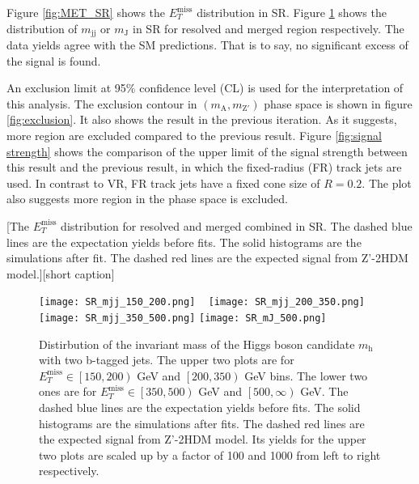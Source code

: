 \documentclass[class=NCU_thesis, crop=false]{standalone}
\begin{document}
	Figure \ref{fig:MET_SR} shows the $E_T^{\mathrm{miss}}$ distribution in SR. Figure \ref{fig:SR_mj} shows the distribution of $m_{\mathrm{jj}}$ or $m_{\mathrm{J}}$ in SR for resolved and merged region respectively. The data yields agree with the SM predictions. That is to say, no significant excess of the signal is found.
	
	An exclusion limit at 95\% confidence level (CL) is used for the interpretation of this analysis. The exclusion contour in $(m_{\mathrm{A}}, m_{\mathrm{Z'}})$ phase space is shown in figure \ref{fig:exclusion}. It also shows the result in the previous iteration. As it suggests, more region are excluded compared to the previous result. Figure \ref{fig:signal strength} shows the comparison of the upper limit of the signal strength between this result and the previous result, in which the fixed-radius (FR) track jets are used. In contrast to VR, FR track jets have a fixed cone size of $R = 0.2$. The plot also suggests more region in the phase space is excluded.
	
	[The $E_T^{\mathrm{miss}}$ distribution for resolved and merged combined in SR. The dashed blue lines are the expectation yields before fits. The solid histograms are the simulations after fit. The dashed red lines are the expected signal from Z'-2HDM model.][short caption]
	
	\begin{figure}[!hbt]
		\centering
		\subcaptionbox
		{\label{fig:subfig_SR_mjj_150_200}}
		{\texttt{[image: SR\_mjj\_150\_200.png]}}
		~
		\subcaptionbox
		{\label{fig:subfig_SR_mjj_200_350}}
		{\texttt{[image: SR\_mjj\_200\_350.png]}}
		\vspace{\baselineskip} %
		\subcaptionbox
		{\label{fig:subfig_SR_mjj_350_500}}
		{\texttt{[image: SR\_mjj\_350\_500.png]}}
		\subcaptionbox
		{\label{fig:subfig_SR_mJ_500}}
		{\texttt{[image: SR\_mJ\_500.png]}}
		\caption{Distirbution of the invariant mass of the Higgs boson candidate $m_{\mathrm{h}}$ with two b-tagged jets. The upper two plots are for $E_T^{\mathrm{miss}} \in \left[150, 200\right)$ GeV and $\left[200, 350\right)$ GeV bins. The lower two ones are for $E_T^{\mathrm{miss}} \in \left[350, 500\right)$ GeV and $\left[500, \infty \right)$ GeV. The dashed blue lines are the expectation yields before fits. The solid histograms are the simulations after fits. The dashed red lines are the expected signal from Z'-2HDM model. Its yields for the upper two plots are scaled up by a factor of 100 and 1000 from left to right respectively.}
		\label{fig:SR_mj}
	\end{figure}
	
\end{document}
